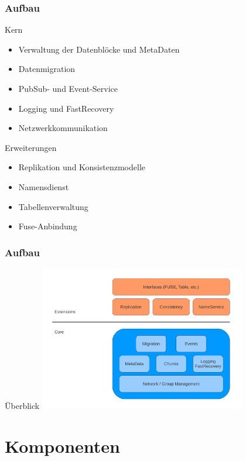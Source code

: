 \documentclass{beamer}
\begin{document}
	\begin{frame}
		\frametitle{Aufbau}

		\begin{block}{Kern}
			\begin{itemize}
				\item Verwaltung der Datenblöcke und MetaDaten
				\item Datenmigration
				\item PubSub- und Event-Service
				\item Logging und FastRecovery
				\item Netzwerkkommunikation
			\end{itemize}
		\end{block}

		\begin{block}{Erweiterungen}
			\begin{itemize}
				\item Replikation und Konsistenzmodelle
				\item Namensdienst
				\item Tabellenverwaltung
				\item Fuse-Anbindung
			\end{itemize}
		\end{block}
	\end{frame}

	\begin{frame}
		\frametitle{Aufbau}

		\begin{block}{Überblick}
			\center\includegraphics[width=9cm]{../img/aufbau}
		\end{block}
	\end{frame}

\section{Komponenten}
\end{document}

